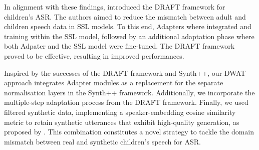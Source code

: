 In alignment with these findings, \cite{fan2022draft} introduced the \ac{DRAFT} framework for children's \ac{ASR}. The authors aimed to reduce the mismatch between adult and children speech data in \ac{SSL} models. To this end, Adapters where integrated and training within the \ac{SSL} model, followed by an additional adaptation phase where both Adpater and the \ac{SSL} model were fine-tuned. The \ac{DRAFT} framework proved to be effective, resulting in improved performances.


Inspired by the successes of the \ac{DRAFT} framework and Synth++, our \ac{DWAT} approach integrates Adapter modules as a replacement for the separate normalisation layers in the Synth++ framework. Additionally, we incorporate the multiple-step adaptation process from the \ac{DRAFT} framework. Finally, we used filtered synthetic data, implementing a speaker-embedding cosine similarity metric to retain synthetic utterances that exhibit high-quality generation, as proposed by \cite{wang2021towards}. This combination constitutes a novel strategy to tackle the domain mismatch between real and synthetic children's speech for \ac{ASR}.



